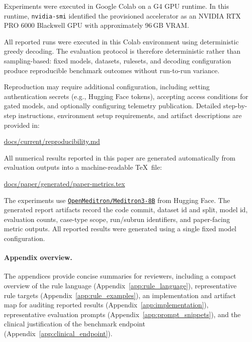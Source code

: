 \documentclass[twocolumn]{article}
\newcommand{\hfmodel}[1]{%
  \href{https://huggingface.co/#1}{\nolinkurl{#1}}%
}
\begin{document}
Experiments were executed in Google Colab on a G4 GPU runtime. In this runtime,
\texttt{nvidia-smi} identified the provisioned accelerator as an NVIDIA RTX PRO
6000 Blackwell GPU with approximately 96\,GB VRAM\@.

All reported runs were executed in this Colab environment using deterministic
greedy decoding. The evaluation protocol is therefore deterministic rather than
sampling-based: fixed models, datasets, rulesets, and decoding configuration
produce reproducible benchmark outcomes without run-to-run variance.

Reproduction may require additional configuration, including setting
authentication secrets (e.g., Hugging Face tokens), accepting access
conditions for gated models, and optionally configuring telemetry
publication. Detailed step-by-step instructions, environment setup
requirements, and artifact descriptions are provided in:

\begin{center}
\href{https://github.com/victorlavrenko/answer-engineering/blob/main/docs/current/reproducibility.md}
{docs/current/reproducibility.md}
\end{center}

All numerical results reported in this paper are generated automatically
from evaluation outputs into a machine-readable \TeX\ file:

\begin{center}
\href{https://github.com/victorlavrenko/answer-engineering/blob/main/docs/paper/generated/paper-metrics.tex}
{docs/paper/generated/paper-metrics.tex}
\end{center}

The experiments use \hfmodel{OpenMeditron/Meditron3-8B} from Hugging Face. %
The generated report artifacts record the code commit, dataset id and split,
model id, evaluation counts, case-type scope, run/subrun identifiers, and
paper-facing metric outputs. All reported results were generated using a single
fixed model configuration.

\paragraph{Appendix overview.}

The appendices provide concise summaries for reviewers, including a compact
overview of the rule language (Appendix~\ref{app:rule_language}), representative
rule targets (Appendix~\ref{app:rule_examples}), an implementation and artifact
map for auditing reported results (Appendix~\ref{app:implementation}),
representative evaluation prompts (Appendix~\ref{app:prompt_snippets}), and the
clinical justification of the benchmark endpoint
(Appendix~\ref{app:clinical_endpoint}).
\end{document}
